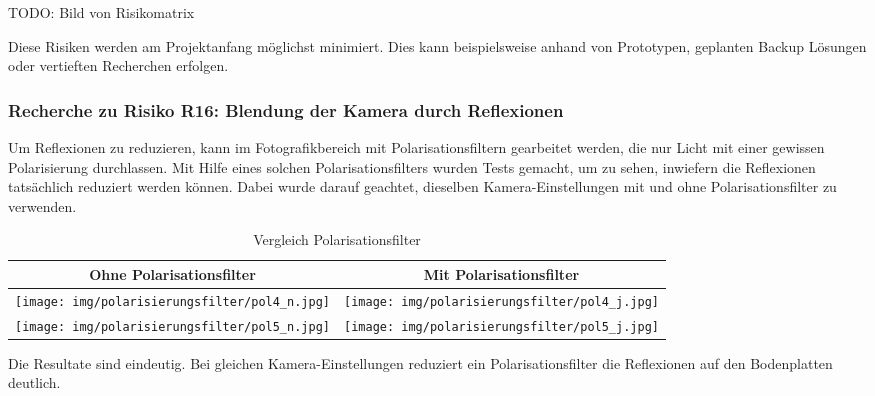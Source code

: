 \documentclass[../main.tex]{subfiles}
\begin{document}
\newpage
TODO: Bild von Risikomatrix

Diese Risiken werden am Projektanfang möglichst minimiert. Dies kann beispielsweise anhand von Prototypen, geplanten Backup Lösungen oder vertieften Recherchen erfolgen.

\subsubsection{Recherche zu Risiko R16: Blendung der Kamera durch Reflexionen}
Um Reflexionen zu reduzieren, kann im Fotografikbereich mit Polarisationsfiltern gearbeitet werden, die nur Licht mit einer gewissen Polarisierung durchlassen. Mit Hilfe eines solchen Polarisationsfilters wurden Tests gemacht, um zu sehen, inwiefern die Reflexionen tatsächlich reduziert werden können. Dabei wurde darauf geachtet, dieselben Kamera-Einstellungen mit und ohne Polarisationsfilter zu verwenden.

\begin{table}[h!]
    \centering
    \begin{tabular}{|c|c|}
        \hline
        \parbox[c][1cm][c]{3cm}{\centering Ohne Polarisationsfilter} &
        \parbox[c][1cm][c]{3cm}{\centering Mit Polarisationsfilter} \\
        \hline
        \texttt{[image: img/polarisierungsfilter/pol4\_n.jpg]} & 
        \texttt{[image: img/polarisierungsfilter/pol4\_j.jpg]}  \\
        \hline 
        \texttt{[image: img/polarisierungsfilter/pol5\_n.jpg]} & 
        \texttt{[image: img/polarisierungsfilter/pol5\_j.jpg]} \\
        \hline
    \end{tabular}
    \caption{Vergleich Polarisationsfilter}
\end{table}

Die Resultate sind eindeutig. Bei gleichen Kamera-Einstellungen reduziert ein Polarisationsfilter die Reflexionen auf den Bodenplatten deutlich.


\addtocounter{subsection}{1}



\end{document}
